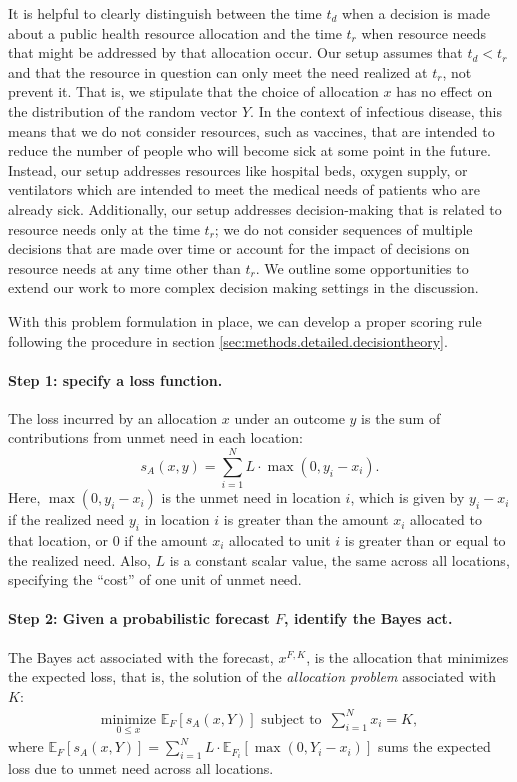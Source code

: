 \documentclass{article}\usepackage[]{graphicx}\usepackage[]{xcolor}
\begin{document}
It is helpful to clearly distinguish between the time $t_d$ when a decision is made about a public health
resource allocation and the time $t_r$ when resource needs that might be addressed by that allocation occur. Our
setup assumes that $t_d < t_r$ and that the resource in question can only meet the need realized at $t_r$, not prevent
it. That is, we stipulate that the choice of allocation $x$ has no effect on the distribution of the random vector $Y$. In the
context of infectious disease, this means that we do not consider resources, such as vaccines, that are intended to
reduce the number of people who will become sick at some point in the future. Instead, our setup addresses resources
like hospital beds, oxygen supply, or ventilators which are intended to meet the medical needs of patients who are
already sick. Additionally, our setup addresses decision-making that is related to resource needs only at the time
$t_r$; we do not consider sequences of multiple decisions that are made over time or account for the impact of decisions
on resource needs at any time other than $t_r$. We outline some opportunities to extend our work to more complex
decision making settings in the discussion.

With this problem formulation in place, we can develop a proper scoring rule following the procedure in section
\ref{sec:methods.detailed.decisiontheory}.

\paragraph{Step 1: specify a loss function.} The loss incurred by an allocation $x$ under an outcome $y$ is the sum of
contributions from unmet need in each location:
\begin{equation}
  s_A(x, y) = \sum_{i=1}^N L \cdot \max(0, y_i - x_i). \label{eqn:loss_fn}
\end{equation}
Here, $\max(0, y_i - x_i)$ is the unmet need in location $i$, which is given by $y_i - x_i$ if the realized need $y_i$
in location $i$ is greater than the amount $x_i$ allocated to that location, or $0$ if the amount $x_i$ allocated to
unit $i$ is greater than or equal to the realized need. Also, $L$ is a constant scalar value, the same across all
locations, specifying the ``cost'' of one unit of unmet need.

\paragraph{Step 2: Given a probabilistic forecast $F$, identify the Bayes act.} The Bayes act associated with the
forecast, $x^{F,K}$, is the allocation that minimizes the expected loss, that is, the solution of the \emph{allocation
problem} associated with $K$:
\begin{align}
  \underset{0 \leq x}{\mathrm{minimize}}\,\, \mathbb{E}_{F} [s_A(x, Y)] \text{ subject to }
  \, \sum_{i=1}^N x_i = K, \label{eqn:AP}
\end{align}
where $\mathbb{E}_{F} [s_A(x, Y)] = \sum_{i=1}^{N} L \cdot \mathbb{E}_{F_i}[\max(0, Y_i - x_i)]$ sums the expected loss
due to unmet need across all locations.
\end{document}

